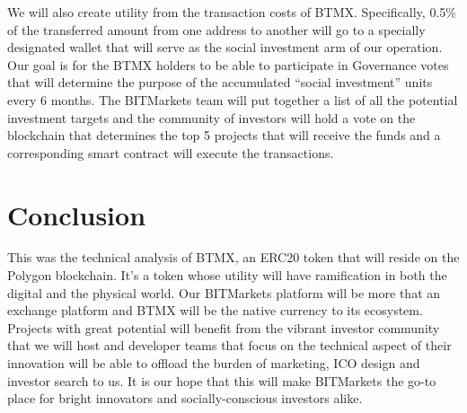 \documentclass[a4paper,12pt]{article}
\begin{document}
We will also create utility from the transaction costs of BTMX. Specifically,
0.5\% of the transferred amount from one address to another will go to
a specially designated wallet that will serve as the social investment arm of our
operation.
Our goal is for the BTMX holders to be able to participate in Governance votes that
will determine the purpose of the accumulated ``social investment'' units every 6 months.
The BITMarkets team will put together a list of all the potential investment targets and
the community of investors will hold a vote on the blockchain that determines the top 5
projects that will receive the funds and a corresponding smart contract will execute the
transactions.

\section{Conclusion}

This was the technical analysis of BTMX, an ERC20 token that will reside on the Polygon
blockchain. It's a token whose utility will have ramification in both the digital and
the physical world. Our BITMarkets platform will be more that an exchange platform and
BTMX will be the native currency to its ecosystem. Projects with great potential will
benefit from the vibrant investor community that we will host and developer teams that
focus on the technical aspect of their innovation will be able to offload the burden of
marketing, ICO design and investor search to us.
It is our hope that this will make BITMarkets the go-to place for bright innovators and
socially-conscious investors alike.
\end{document}
